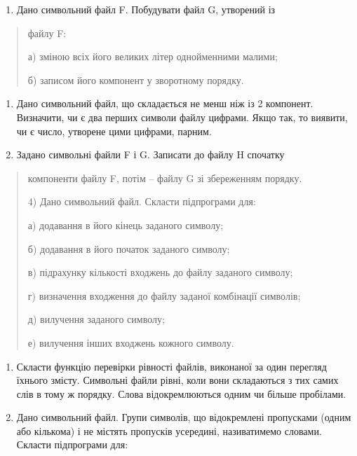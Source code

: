 \documentclass[]{article}
\begin{document}
\begin{enumerate}
\def\labelenumi{\arabic{enumi})}
\item
  Дано символьний файл F. Побудувати файл G, утворений із
\end{enumerate}

\begin{quote}
файлу F:

а) зміною всіх його великих літер однойменними малими;

б) записом його компонент у зворотному порядку.
\end{quote}

\begin{enumerate}
\def\labelenumi{\arabic{enumi})}
\item
  Дано символьний файл, що складається не менш ніж із 2 компонент.
  Визначити, чи є два перших символи файлу цифрами. Якщо так, то
  виявити, чи є число, утворене цими цифрами, парним.
\item
  Задано символьні файли F і G. Записати до файлу H спочатку
\end{enumerate}

\begin{quote}
компоненти файлу F, потім -- файлу G зі збереженням порядку.

4) Дано символьний файл. Скласти підпрограми для:

а) додавання в його кінець заданого символу;

б) додавання в його початок заданого символу;

в) підрахунку кількості входжень до файлу заданого символу;

г) визначення входження до файлу заданої комбінації символів;

д) вилучення заданого символу;

е) вилучення інших входжень кожного символу.
\end{quote}

\begin{enumerate}
\def\labelenumi{\arabic{enumi})}
\item
  Скласти функцію перевірки рівності файлів, виконаної за один перегляд
  їхнього змісту. Символьні файли рівні, коли вони складаються з тих
  самих слів в тому ж порядку. Слова відокремлюються одним чи більше
  пробілами.
\item
  Дано символьний файл. Групи символів, що відокремлені пропусками
  (одним або кількома) і не містять пропусків усередині, називатимемо
  словами. Скласти підпрограми для:
\end{enumerate}
\end{document}

